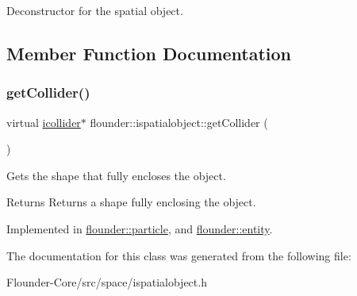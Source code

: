 Deconstructor for the spatial object. 



\subsection{Member Function Documentation}
\mbox{\label{classflounder_1_1ispatialobject_af3867cbb5f35b0296a16af77703e6c81}} 
\subsubsection{\texorpdfstring{get\+Collider()}{getCollider()}}
{\footnotesize\ttfamily virtual \hyperlink{classflounder_1_1icollider}{icollider}$\ast$ flounder\+::ispatialobject\+::get\+Collider (\begin{DoxyParamCaption}{ }\end{DoxyParamCaption})\hspace{0.3cm}{\ttfamily [pure virtual]}}



Gets the shape that fully encloses the object. 

\begin{DoxyReturn}{Returns}
Returns a shape fully enclosing the object. 
\end{DoxyReturn}


Implemented in \hyperlink{classflounder_1_1particle_a158ec50298e711488720eaf36600f828}{flounder\+::particle}, and \hyperlink{classflounder_1_1entity_a4b68d0d58f2ff338058a2fa0d1a2e413}{flounder\+::entity}.



The documentation for this class was generated from the following file\+:\begin{DoxyCompactItemize}
\item 
Flounder-\/\+Core/src/space/ispatialobject.\+h\end{DoxyCompactItemize}
